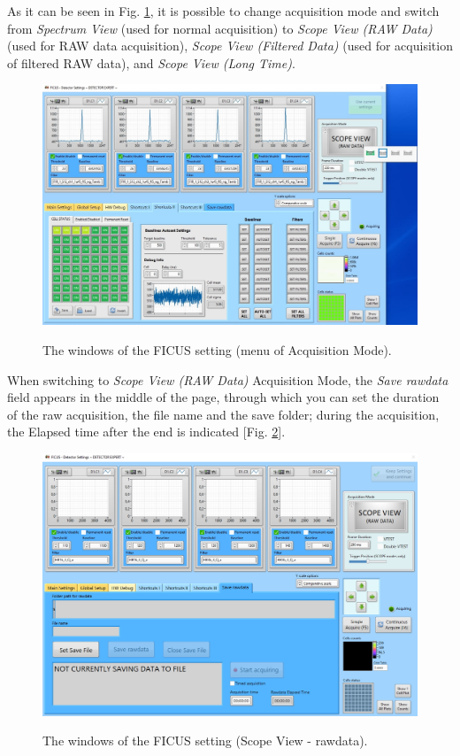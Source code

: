 \documentclass[a4paper,12pt,oneside,pdflatex,italian,final,twocolumn]{article}
\begin{document}
As it can be seen in Fig. \ref{fig:fig16}, it is possible to change acquisition mode and switch from \textit{Spectrum View} (used for normal acquisition) to \textit{Scope View (RAW Data)} (used for RAW data acquisition), \textit{Scope View (Filtered Data)} (used for acquisition of filtered RAW data), and \textit{Scope View (Long Time)}.

\begin{figure}[h]
\centering
{\includegraphics[width=.95\textwidth]{Capture22.jpg}} \quad
\caption{The windows of the FICUS setting (menu of Acquisition Mode).}\label{fig:fig16}
\end{figure}

When switching to \textit{Scope View (RAW Data)} Acquisition Mode, the \textit{Save rawdata} field appears in the middle of the page, through which you can set the duration of the raw acquisition, the file name and the save folder; during the acquisition, the Elapsed time after the end is indicated [Fig. \ref{fig:fig17}].

\begin{figure}[h]
\centering
{\includegraphics[width=.85\textwidth]{Cattura64.jpg}} \quad
\caption{The windows of the FICUS setting (Scope View - rawdata).}\label{fig:fig17}
\end{figure}
\end{document}
